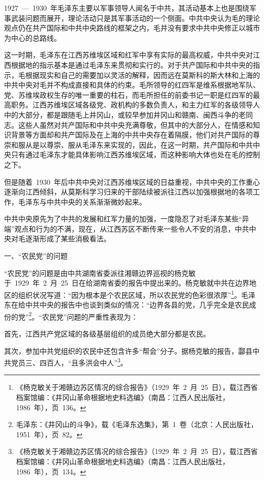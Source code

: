 1927~—~1930~年毛泽东主要以军事领导人闻名于中共，其活动基本上也是围绕军事武装问题而展开，理论活动只是其军事活动的一个侧面。中共中央认为毛的理论观点仍在共产国际和中共中央路线的框架之内，毛并没有要求中共中央修正以城市为中心的总路线。

这一时期，毛泽东在江西苏维埃区域和红军中享有实际的最高权威，中共中央对江西根据地的指示基本是通过毛泽东来贯彻和实行的。对于共产国际和中共中央的指示，毛根据现实和自己的需要加以灵活的解释，因而远在莫斯科的斯大林和上海的中共中央对毛并不构成直接和具体的约束。毛所领导的红四军是维系根据地军队、党、苏维埃政权生存的唯一重要的柱石，而毛所担任的前委书记一职是红四军的最高职务。江西苏维埃区域各级党、政机构的多数负责人，和主力红军的各级领导人中的大部分，都是跟随毛上井冈山，或较早参加井冈山和赣南、闽西斗争的老同志。这些人虽然对共产国际和中共中央充满尊敬，但其中的大部分人，在情感和知识背景等方面却和共产国际及在上海的中共中央存在着隔膜，他们对共产国际的尊崇和服从是以尊崇、服从毛泽东来实现的，因此，在这一时期，共产国际和中共中央只有通过毛泽东才能具体影响江西苏维埃区域，而这种影响大体也处在毛的控制之下。

但是随着~1930~年后中共中央对江西苏维埃区域的日益重视，中共中央的工作重心逐渐向江西倾斜，从莫斯科学习归来的干部陆续被派往江西以加强根据地的各项工作，毛泽东与中共中央的关系渐渐微妙起来。

中共中央原先为了中共的发展和红军力量的加强，一度隐忍了对毛泽东某些“异端”观点和行为的不满，现在，从江西苏区不断传来一些令人不安的消息，中共中央对毛逐渐形成了某些消极看法。

一、“农民党”的问题

“农民党”的问题是由中共湖南省委派往湘赣边界巡视的杨克敏于~1929~年~2~月~25~日在给湖南省委的报告中提出来的。杨克敏就中共在边界地区的组织状况写道：“因为根本是个农民区域，所以农民党的色彩很浓厚”\footnote{《杨克敏关于湘赣边苏区情况的综合报告》（1929~年~2~月~25~日），载江西省档案馆编：《井冈山革命根据地史料选编》（南昌：江西人民出版社，1986~年），页~136。}。毛泽东在给中共中央的报告中也谈到类似的情况：“边界各县的党，几乎完全是农民成份的党”\footnote{毛泽东：《井冈山的斗争》，载《毛泽东选集》，第~1~卷（北京：人民出版社，1951~年），页~82。}。“农民党”问题的严重性表现为：

首先，江西共产党区域的各级基层组织的成员绝大部分都是农民。

其次，参加中共党组织的农民中还包含许多“帮会”分子。据杨克敏的报告，酃县中共党员三、四百人，“且多洪会中人”\footnote{《杨克敏关于湘赣边苏区情况的综合报告》（1929~年~2~月~25~日），载江西省档案馆编：《井冈山革命根据地史料选编》（南昌：江西人民出版社，1986~年），页~134。}。


